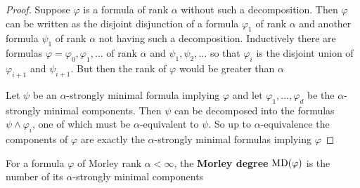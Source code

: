 \documentclass[11pt]{article}
\begin{document}
\begin{proof}
Suppose \(\varphi\) is a formula of rank \(\alpha\) without such a decomposition. Then \(\varphi\) can be written as the
disjoint disjunction of a formula \(\varphi_1\) of rank \(\alpha\) and another formula \(\psi_1\) of rank \(\alpha\) not having
such a decomposition.
Inductively there are formulas \(\varphi=\varphi_0,\varphi_1,\dots\) of rank \(\alpha\) and \(\psi_1,\psi_2,\dots\) so
that \(\varphi_i\) is the disjoint union of \(\varphi_{i+1}\) and \(\psi_{i+1}\). But then the rank of \(\varphi\) would
be greater than \(\alpha\)

Let \(\psi\) be an \(\alpha\)-strongly minimal formula implying \(\varphi\) and let \(\varphi_1,\dots,\varphi_d\) be the \(\alpha\)-strongly minimal
components. Then \(\psi\) can be decomposed into the formulas \(\psi\wedge\varphi_i\), one of which must be
\(\alpha\)-equivalent to \(\psi\).
So up to \(\alpha\)-equivalence the components of \(\varphi\) are exactly the \(\alpha\)-strongly minimal formulas implying \(\varphi\)
\end{proof}


\begin{definition}[]
For a formula \(\varphi\) of Morley rank \(\alpha<\infty\), the \textbf{Morley degree} \(\operatorname{MD}(\varphi)\) is the number of its
\(\alpha\)-strongly minimal components
\end{definition}
\end{document}
